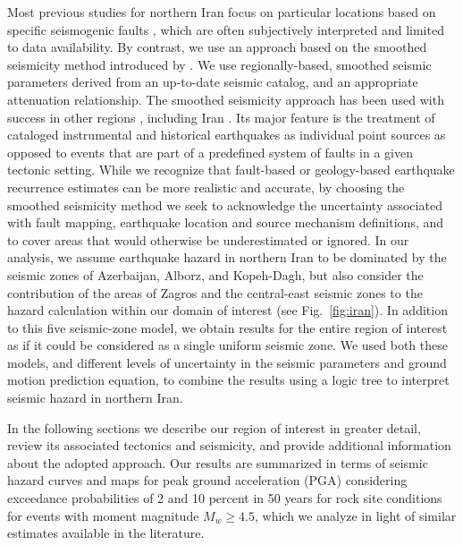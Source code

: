 Most previous studies for northern Iran focus on particular locations based on specific seismogenic faults \citep[e.g.][]{Ghodrati2003,Vafaie2011,Abdi2013}, which are often subjectively interpreted and limited to data availability. By contrast, we use an approach based on the smoothed seismicity method introduced by \citet{Frankel1995}. We use regionally-based, smoothed seismic parameters derived from an up-to-date seismic catalog, and an appropriate attenuation relationship. The smoothed seismicity approach has been used with success in other regions \citep[e.g.][]{Cao1996, Akinci2004, Kalkan2009}, including Iran \citep{Khodaverdian_2016_BSSA}. Its major feature is the treatment of cataloged instrumental and historical earthquakes as individual point sources as opposed to events that are part of a predefined system of faults in a given tectonic setting. While we recognize that fault-based or geology-based earthquake recurrence estimates can be more realistic and accurate, by choosing the smoothed seismicity method we seek to acknowledge the uncertainty associated with fault mapping, earthquake location and source mechanism definitions, and to cover areas that would otherwise be underestimated or ignored. In our analysis, we assume earthquake hazard in northern Iran to be dominated by the seismic zones of Azerbaijan, Alborz, and Kopeh-Dagh, but also consider the contribution of the areas of Zagros and the central-east seismic zones to the hazard calculation within our domain of interest (see Fig.~\ref{fig:iran}). In addition to this five seismic-zone model, we obtain results for the entire region of interest as if it could be considered as a single uniform seismic zone. We used both these models, and different levels of uncertainty in the seismic parameters and ground motion prediction equation, to combine the results using a logic tree to interpret seismic hazard in northern Iran.

In the following sections we describe our region of interest in greater detail, review its associated tectonics and seismicity, and provide additional information about the adopted approach. Our results are summarized in terms of seismic hazard curves and maps for peak ground acceleration (PGA) considering exceedance probabilities of 2 and 10 percent in 50 years for rock site conditions for events with moment magnitude $M_w \geq 4.5$, which we analyze in light of similar estimates available in the literature.
